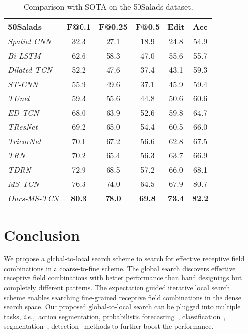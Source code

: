 \documentclass[final]{cvpr}
\newcommand{\tbf}[1]{\textbf{#1}}
\def\ie{\emph{i.e.,~}}
\begin{document}
\begin{table}[t]
   \small
   \centering 
   \setlength{\tabcolsep}{1.8mm}
   \begin{tabular}{lccccc}  \toprule
   \tbf{50Salads} 
   & F@0.1 & F@0.25 & F@0.5 & Edit & Acc  \\
   \midrule
   \textsl{Spatial CNN~\cite{lea2016segmental}}
   & 32.3 & 27.1 & 18.9 & 24.8 & 54.9 \\
   \textsl{Bi-LSTM~\cite{singh2016multi}}
   & 62.6 & 58.3 & 47.0 & 55.6 & 55.7 \\
   \textsl{Dilated TCN~\cite{lea2017temporal}}
   & 52.2 & 47.6 & 37.4 & 43.1 & 59.3 \\
   \textsl{ST-CNN~\cite{lea2016segmental}}
   & 55.9 & 49.6 & 37.1 & 45.9 & 59.4 \\
   \textsl{TUnet~\cite{ronneberger2015u}}
   & 59.3 & 55.6 & 44.8 & 50.6 & 60.6 \\
   \textsl{ED-TCN~\cite{lea2017temporal}}
   & 68.0 & 63.9 & 52.6 & 59.8 & 64.7 \\
   \textsl{TResNet~\cite{he2016deep}}
   & 69.2 & 65.0 & 54.4 & 60.5 & 66.0 \\
   \textsl{TricorNet~\cite{ding2017tricornet}}
   & 70.1 & 67.2 & 56.6 & 62.8 & 67.5 \\
   \textsl{TRN~\cite{lei2018temporal}}
   & 70.2 & 65.4 & 56.3 & 63.7 & 66.9 \\
   \textsl{TDRN~\cite{lei2018temporal}}
   & 72.9 & 68.5 & 57.2 & 66.0 & 68.1 \\
   \hline
   \textsl{MS-TCN~\cite{farha2019ms}}
   & 76.3 & 74.0 & 64.5 & 67.9 & 80.7 \\
   \textsl{Ours-MS-TCN}
   & \tbf{80.3} & \tbf{78.0} & \tbf{69.8} & \tbf{73.4} & \tbf{82.2} \\
   \bottomrule
   \end{tabular}
   \vspace{2pt}
   \caption{Comparison with SOTA on the 50Salads dataset.} 
   \vspace{-10pt}
   \label{tab:compare_sota_gtea_50}
\end{table}







\section{Conclusion}
We propose a global-to-local search scheme to search for effective receptive
field combinations in a coarse-to-fine scheme.
The global search discovers effective receptive field combinations with better performance than hand designings
but completely different patterns.
The expectation guided iterative local search scheme enables searching 
fine-grained receptive field combinations in the dense search space.
Our proposed global-to-local search can be plugged into multiple tasks, 
\ie action segmentation, probabilistic forecasting~\cite{chen2020probabilistic}, 
classification~\cite{pami20Res2net,gu2021dots,gao2021rbn}, 
segmentation~\cite{GaoEccv20Sal100K,VecRoad_20CVPR,gu2020pyramid}, detection~\cite{ren2015faster,HanEccv20SemLine} methods to further boost the performance.
\end{document}
